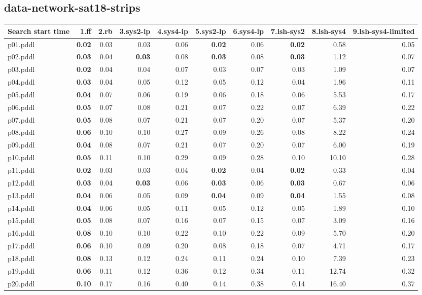 \documentclass{article}
\begin{document}
\hypertarget{search_start_time-data-network-sat18-strips}{}
\subsection*{data-network-sat18-strips}

\begin{tabular}{@{}lrrrrrrrrr@{}}
Search start time & 1.ff & 2.rb & 3.sys2-ip & 4.sys4-ip & 5.sys2-lp & 6.sys4-lp & 7.lsh-sys2 & 8.lsh-sys4 & 9.lsh-sys4-limited \\
\midrule
p01.pddl & \textbf{0.02} & 0.03 & 0.03 & 0.06 & \textbf{0.02} & 0.06 & \textbf{0.02} & 0.58 & 0.05 \\
p02.pddl & \textbf{0.03} & 0.04 & \textbf{0.03} & 0.08 & \textbf{0.03} & 0.08 & \textbf{0.03} & 1.12 & 0.07 \\
p03.pddl & \textbf{0.02} & 0.04 & 0.04 & 0.07 & 0.03 & 0.07 & 0.03 & 1.09 & 0.07 \\
p04.pddl & \textbf{0.03} & 0.04 & 0.05 & 0.12 & 0.05 & 0.12 & 0.04 & 1.96 & 0.11 \\
p05.pddl & \textbf{0.04} & 0.07 & 0.06 & 0.19 & 0.06 & 0.18 & 0.06 & 5.53 & 0.17 \\
p06.pddl & \textbf{0.05} & 0.07 & 0.08 & 0.21 & 0.07 & 0.22 & 0.07 & 6.39 & 0.22 \\
p07.pddl & \textbf{0.05} & 0.08 & 0.07 & 0.21 & 0.07 & 0.20 & 0.07 & 5.37 & 0.20 \\
p08.pddl & \textbf{0.06} & 0.10 & 0.10 & 0.27 & 0.09 & 0.26 & 0.08 & 8.22 & 0.24 \\
p09.pddl & \textbf{0.04} & 0.08 & 0.07 & 0.21 & 0.07 & 0.20 & 0.07 & 6.00 & 0.19 \\
p10.pddl & \textbf{0.05} & 0.11 & 0.10 & 0.29 & 0.09 & 0.28 & 0.10 & 10.10 & 0.28 \\
p11.pddl & \textbf{0.02} & 0.03 & 0.03 & 0.04 & \textbf{0.02} & 0.04 & \textbf{0.02} & 0.33 & 0.04 \\
p12.pddl & \textbf{0.03} & 0.04 & \textbf{0.03} & 0.06 & \textbf{0.03} & 0.06 & \textbf{0.03} & 0.67 & 0.06 \\
p13.pddl & \textbf{0.04} & 0.06 & 0.05 & 0.09 & \textbf{0.04} & 0.09 & \textbf{0.04} & 1.55 & 0.08 \\
p14.pddl & \textbf{0.04} & 0.06 & 0.05 & 0.11 & 0.05 & 0.12 & 0.05 & 1.89 & 0.10 \\
p15.pddl & \textbf{0.05} & 0.08 & 0.07 & 0.16 & 0.07 & 0.15 & 0.07 & 3.09 & 0.16 \\
p16.pddl & \textbf{0.08} & 0.10 & 0.10 & 0.22 & 0.10 & 0.22 & 0.09 & 5.70 & 0.20 \\
p17.pddl & \textbf{0.06} & 0.10 & 0.09 & 0.20 & 0.08 & 0.18 & 0.07 & 4.71 & 0.17 \\
p18.pddl & \textbf{0.08} & 0.13 & 0.12 & 0.24 & 0.11 & 0.24 & 0.10 & 7.39 & 0.23 \\
p19.pddl & \textbf{0.06} & 0.11 & 0.12 & 0.36 & 0.12 & 0.34 & 0.11 & 12.74 & 0.32 \\
p20.pddl & \textbf{0.10} & 0.17 & 0.16 & 0.40 & 0.14 & 0.38 & 0.14 & 16.40 & 0.37 \\
\end{tabular}
\end{document}
